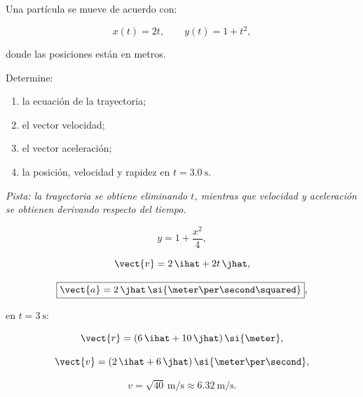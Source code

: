 \begin{ejercicio}
Una partícula se mueve de acuerdo con:

\[
x(t)=2t,
\qquad
y(t)=1+t^2,
\]

donde las posiciones están en metros.

Determine:

\begin{enumerate}[label=\alph*)]
    \item la ecuación de la trayectoria;
    \item el vector velocidad;
    \item el vector aceleración;
    \item la posición, velocidad y rapidez en \(t=\SI{3.0}{\second}\).
\end{enumerate}

\textit{Pista: la trayectoria se obtiene eliminando \(t\), mientras que velocidad y aceleración se obtienen derivando respecto del tiempo.}
\end{ejercicio}

\begin{respuesta}
\[
\boxed{
y=1+\frac{x^2}{4}
},
\]

\[
\vect{v}
=
2\,\ihat+2t\,\jhat,
\]

\[
\boxed{
\vect{a}
=
2\,\jhat\,
\si{\meter\per\second\squared}
},
\]

en \(t=\SI{3}{\second}\):

\[
\vect{r}
=
(6\,\ihat+10\,\jhat)\,\si{\meter},
\]

\[
\vect{v}
=
(2\,\ihat+6\,\jhat)\,
\si{\meter\per\second},
\]

\[
\boxed{
v=\sqrt{40}\,\si{\meter\per\second}
\approx
\SI{6.32}{\meter\per\second}
}.
\]
\end{respuesta}


